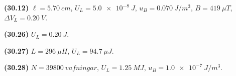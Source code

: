 \begin{enumerate}[label = \textbf{(\alph*)}]
\end{enumerate}


\begin{tcolorbox}
\begin{enumerate*}[label = ]
  \item \textbf{(30.12)} $\ell = \SI{5.70}{cm}$, $U_L = \SI{5.0e-8}{J}$, $u_B = \SI{0.070}{J/m^3}$, $B = \SI{419}{\mu T}$, $\Delta V_L = \SI{0.20}{V}$.
  \item \textbf{(30.26)} $U_L = \SI{0.20}{J}$.
  \item \textbf{(30.27)} $L = \SI{296}{\mu H}$, $U_L = \SI{94.7}{\mu J}$.
  \item \textbf{(30.28)} $N = \SI{39800}{vafningar}$, $U_L = \SI{1.25}{MJ}$, $u_B = \SI{1.0e-7}{J/m^3}$.
\end{enumerate*}
\end{tcolorbox}

\newpage